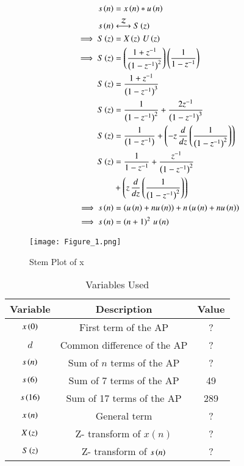 \documentclass[journal,12pt,twocolumn]{IEEEtran}
\theoremstyle{remark}
\begin{document}
\begin{align}
   s\brak{n}&=x\brak{n}*u\brak{n}\\
   s\brak{n}&\system{Z}S\brak{z}\notag\\
   \implies S\brak{z}&=X\brak{z}\,U\brak{z}\\
   \implies S\brak{z}&=\brak{\frac{1+z^{-1}}{\brak{1-z^{-1}}^2}}\brak{\frac{1}{1-z^{-1}}}\\
   S\brak{z}&=\frac{1+z^{-1}}{\brak{1-z^{-1}}^3}\\
   S\brak{z}&=\frac{1}{\brak{1-z^{-1}}^2}+\frac{2z^{-1}}{\brak{1-z^{-1}}^3}\\
   S\brak{z}&=\frac{1}{\brak{1-z^{-1}}}+\brak{-z\,\frac{d}{dz}\brak{\frac{1}{\brak{1-z^{-1}}^2}}}\\
   S\brak{z}&=\frac{1}{1-z^{-1}}+\frac{z^{-1}}{\brak{1-z^{-1}}^2}\notag\\
   &+\brak{z\,\frac{d}{dz}\brak{\frac{1}{\brak{1-z^{-1}}^2}}}\\
   \implies s\brak{n}&=\brak{u\brak{n}+nu\brak{n}}+n\brak{u\brak{n}+nu\brak{n}}\\
   \implies s\brak{n}&=\brak{n+1}^2\,u\brak{n}
\end{align}
\begin{figure}[h!]
   \centering
   \texttt{[image: Figure\_1.png]}
   \caption{Stem Plot of x}
   \label{stemplot}
\end{figure}
\begin{table}[h!]    
   \begin{tabular}[12pt]{ |c| c| c|}
   \hline
   \textbf{Variable} & \textbf{Description} &\textbf{Value}\\ 
   \hline
   $x\left(0\right)$ & First term of the AP &?\\
   \hline 
   $d$ & Common difference of the AP& ?\\
   \hline
   $s\left(n\right)$ & Sum of $n$ terms of the AP& ?\\
   \hline
   $s\left(6\right)$& Sum of 7 terms of the AP& 49\\
   \hline
   $s\left(16\right)$& Sum of 17 terms of the AP&289\\
   \hline
   $x\left(n\right)$ & General term& ?\\
   \hline
   $X\left(z\right)$ & Z- transform of $x(n)$& ?\\
   \hline
   $S\left(z\right)$ &Z- transform of $s\left(n\right)$& ?\\
   \hline    
   \end{tabular}
   \caption{Variables Used}
   \label{tab10.5.3.9.1}
\end{table}
\end{document}

